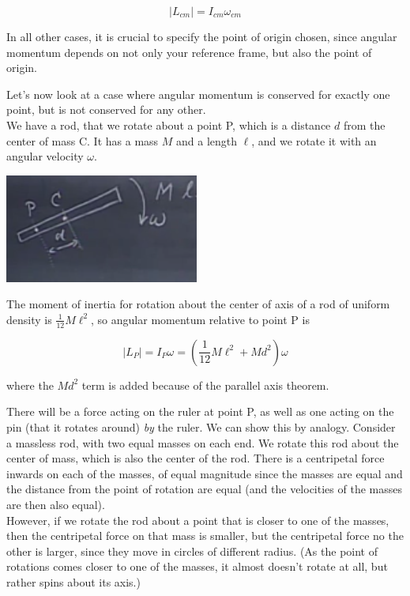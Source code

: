 \documentclass[12pt,a4paper]{report}
\begin{document}
\begin{equation}
|L_{cm}| = I_{cm} \omega_{cm}
\end{equation}

In all other cases, it is crucial to specify the point of origin chosen, since angular momentum depends on not only your reference frame, but also the point of origin.

Let's now look at a case where angular momentum is conserved for exactly one point, but is not conserved for any other.\\
We have a rod, that we rotate about a point P, which is a distance $d$ from the center of mass C. It has a mass $M$ and a length $\ell$, and we rotate it with an angular velocity $\omega$.

\begin{center}
\includegraphics[scale=0.7]{Graphics/lec21_rod}
\end{center}

The moment of inertia for rotation about the center of axis of a rod of uniform density is $\displaystyle \frac{1}{12} M \ell^2$, so angular momentum relative to point P is

\begin{equation}
|L_P| = I_P \omega = \left(\frac{1}{12} M \ell^2 + M d^2\right) \omega
\end{equation}

where the $M d^2$ term is added because of the parallel axis theorem.

There will be a force acting on the ruler at point P, as well as one acting on the pin (that it rotates around) \emph{by} the ruler. We can show this by analogy. Consider a massless rod, with two equal masses on each end. We rotate this rod about the center of mass, which is also the center of the rod. There is a centripetal force inwards on each of the masses, of equal magnitude since the masses are equal and the distance from the point of rotation are equal (and the velocities of the masses are then also equal).\\
However, if we rotate the rod about a point that is closer to one of the masses, then the centripetal force on that mass is smaller, but the centripetal force no the other is larger, since they move in circles of different radius. (As the point of rotations comes closer to one of the masses, it almost doesn't rotate at all, but rather spins about its axis.)
\end{document}
